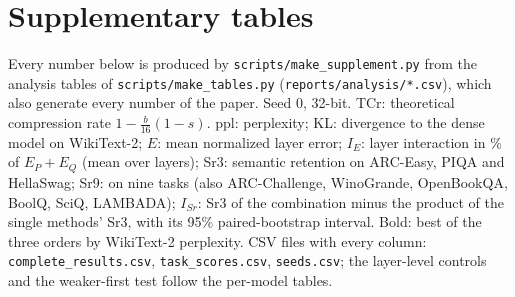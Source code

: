 \documentclass{article}
\begin{document}
\footnotesize
\section*{Supplementary tables}
Every number below is produced by \texttt{scripts/make\_supplement.py} from the analysis tables of \texttt{scripts/make\_tables.py} (\texttt{reports/analysis/*.csv}), which also generate every number of the paper. Seed 0, 32-bit. TCr: theoretical compression rate $1-\frac{b}{16}(1-s)$. ppl: perplexity; KL: divergence to the dense model on WikiText-2; $E$: mean normalized layer error; $I_E$: layer interaction in \% of $E_P+E_Q$ (mean over layers); Sr3: semantic retention on ARC-Easy, PIQA and HellaSwag; Sr9: on nine tasks (also ARC-Challenge, WinoGrande, OpenBookQA, BoolQ, SciQ, LAMBADA); $I_{Sr}$: Sr3 of the combination minus the product of the single methods' Sr3, with its 95\% paired-bootstrap interval. Bold: best of the three orders by WikiText-2 perplexity. CSV files with every column: \texttt{complete\_results.csv}, \texttt{task\_scores.csv}, \texttt{seeds.csv}; the layer-level controls and the weaker-first test follow the per-model tables.
\end{document}
